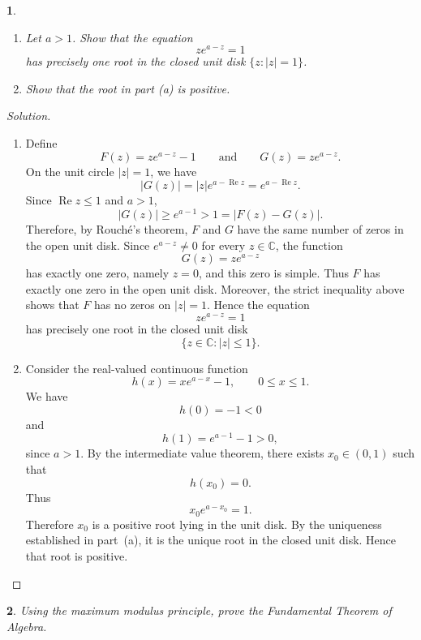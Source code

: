 \documentclass[12pt, a4paper]{report}
\theoremstyle{spaced}
\newtheorem{exercise}{}
\begin{document}
\begin{exercise}
	\begin{enumerate}
		\item[(a)] Let \(a>1\). Show that the equation
			\[
				ze^{a-z}=1
			\]
			has precisely one root in the closed unit disk
			\(\{z:|z|=1\}\).
		\item[(b)] Show that the root in part (a) is positive.
	\end{enumerate}
\end{exercise}
\begin{proof}[Solution]
	\begin{enumerate}
		\item[(a)] Define
			\[
				F(z)=ze^{a-z}-1
				\qquad\text{and}\qquad
				G(z)=ze^{a-z}.
			\]
			On the unit circle \(|z|=1\), we have
			\[
				|G(z)|
				=
				|z|e^{a-\operatorname{Re}z}
				=
				e^{a-\operatorname{Re}z}.
			\]
			Since \(\operatorname{Re}z\leq 1\) and \(a>1\),
			\[
				|G(z)|
				\geq e^{a-1}
				>1
				=
				|F(z)-G(z)|.
			\]
			Therefore, by Rouch\'e's theorem, \(F\) and \(G\) have the
			same number of zeros in the open unit disk.
			Since \(e^{a-z}\neq 0\) for every \(z\in\mathbb{C}\), the
			function
			\[
				G(z)=ze^{a-z}
			\]
			has exactly one zero, namely \(z=0\), and this zero is simple.
			Thus \(F\) has exactly one zero in the open unit disk.
			Moreover, the strict inequality above shows that \(F\) has no
			zeros on \(|z|=1\). Hence the equation
			\[
				ze^{a-z}=1
			\]
			has precisely one root in the closed unit disk
			\[
				\{z\in\mathbb{C}:|z|\leq 1\}.
			\]

		\item[(b)] Consider the real-valued continuous function
			\[
				h(x)=xe^{a-x}-1,
				\qquad 0\leq x\leq 1.
			\]
			We have
			\[
				h(0)=-1<0
			\]
			and
			\[
				h(1)=e^{a-1}-1>0,
			\]
			since \(a>1\). By the intermediate value theorem, there exists
			\(x_0\in(0,1)\) such that
			\[
				h(x_0)=0.
			\]
			Thus
			\[
				x_0e^{a-x_0}=1.
			\]
			Therefore \(x_0\) is a positive root lying in the unit disk.
			By the uniqueness established in part~(a), it is the unique root
			in the closed unit disk. Hence that root is positive.
	\end{enumerate}
\end{proof}
\begin{exercise}
	Using the maximum modulus principle, prove the Fundamental Theorem of Algebra.
\end{exercise}
\end{document}
